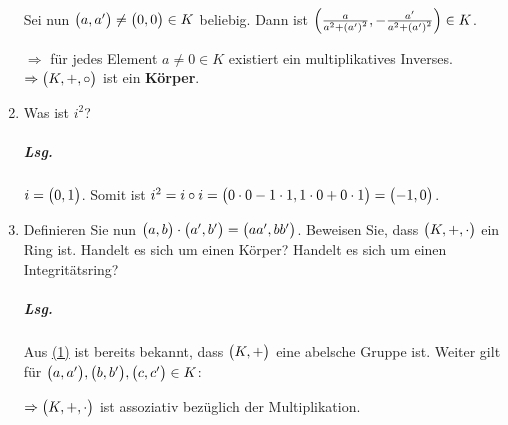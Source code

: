 \documentclass{scrreprt}
\begin{document}
\begin{enumerate}[(1)]
  Sei nun $\qty\big(a, a') \ne \qty\big(0, 0) \in K$ beliebig.
  Dann ist
  $\qty(\frac{a}{a^2 + \qty(a')^2}, -\frac{a'}{a^2 + \qty(a')^2}) \in K$.
  $\Rightarrow$ für jedes Element $a \ne 0 \in K$ existiert ein multiplikatives
  Inverses. \\
  $\Rightarrow \qty\big(K, +, \circ)$ ist ein \textbf{Körper}.

\item Was ist $i^2$?

  \subparagraph{Lsg.} $i = \qty\big(0, 1)$.
  Somit ist $i^2 = i \circ i =
  \qty\big(0 \cdot 0 - 1 \cdot 1, 1 \cdot 0 + 0 \cdot 1) = \qty\big(-1, 0)$.


\item Definieren Sie nun $\qty\big(a, b) \cdot \qty\big(a', b') =
  \qty\big(aa', bb')$.
  Beweisen Sie, dass $\qty\big(K, +, \cdot)$ ein Ring ist.
  Handelt es sich um einen Körper?
  Handelt es sich um einen Integritätsring?

  \subparagraph{Lsg.} Aus \hyperref[sec:5_1]{(1)} ist bereits bekannt, dass
  $\qty\big(K, +)$ eine abelsche Gruppe ist.
  Weiter gilt für $\qty\big(a, a'), \qty\big(b, b'), \qty\big(c, c') \in K$:
  $\Rightarrow \qty\big(K, +, \cdot)$ ist assoziativ bezüglich der
  Multiplikation.


\end{enumerate}
\end{document}
